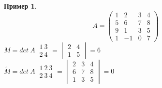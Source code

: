 \documentclass[a4paper, 12pt]{article}
\theoremstyle{definition}
\newtheorem*{example1}{Пример}
\begin{document}
  \begin{example1}
    $$A = \begin{pmatrix}
      1 & 2 & 3 & 4 \\
      5 & 6 & 7 & 8 \\
      9 & 1 & 3 & 5 \\
      1 & -1 & 0 & 7
    \end{pmatrix}$$ 
    $M = det \ A \ \begin{matrix}
      1\ 3 \\ 2 \ 4
    \end{matrix} = \begin{vmatrix}
      2 & 4 \\ 1 & 5
    \end{vmatrix} = 6$ \vspace{0.3cm}\\
    $\widetilde{M} = det \ A \ \begin{matrix}
      1 \ 2 \ 3 \\ 2 \ 3 \ 4
    \end{matrix} = \begin{vmatrix}
      2 & 3 & 4 \\ 6 & 7 & 8 \\ 1 & 3 & 5
    \end{vmatrix} = 0$  
  \end{example1}
  
\end{document}

